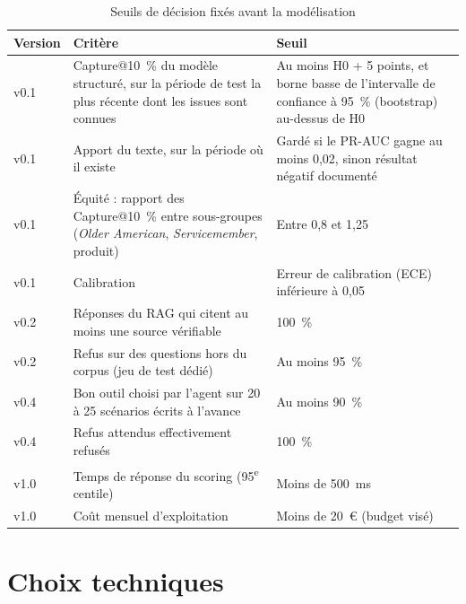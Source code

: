 \documentclass[11pt,a4paper]{article}
\begin{document}
\begin{table}[H]
\centering\small
\begin{tabularx}{\linewidth}{@{}l Y Y@{}}
\toprule
Version & Critère & Seuil \\
\midrule
v0.1 & Capture@10~\% du modèle structuré, sur la période de test la plus récente dont les issues sont connues & Au moins H0 + 5 points, et borne basse de l'intervalle de confiance à 95~\% (bootstrap) au-dessus de H0 \\
v0.1 & Apport du texte, sur la période où il existe & Gardé si le PR-AUC gagne au moins 0,02, sinon résultat négatif documenté \\
v0.1 & Équité : rapport des Capture@10~\% entre sous-groupes (\emph{Older American}, \emph{Servicemember}, produit) & Entre 0,8 et 1,25 \\
v0.1 & Calibration & Erreur de calibration (ECE) inférieure à 0,05 \\
v0.2 & Réponses du RAG qui citent au moins une source vérifiable & 100~\% \\
v0.2 & Refus sur des questions hors du corpus (jeu de test dédié) & Au moins 95~\% \\
v0.4 & Bon outil choisi par l'agent sur 20 à 25 scénarios écrits à l'avance & Au moins 90~\% \\
v0.4 & Refus attendus effectivement refusés & 100~\% \\
v1.0 & Temps de réponse du scoring (95\textsuperscript{e} centile) & Moins de 500~ms \\
v1.0 & Coût mensuel d'exploitation & Moins de 20~€ (budget visé) \\
\bottomrule
\end{tabularx}
\caption{Seuils de décision fixés avant la modélisation}
\end{table}

\clearpage
\section{Choix techniques}
\end{document}

